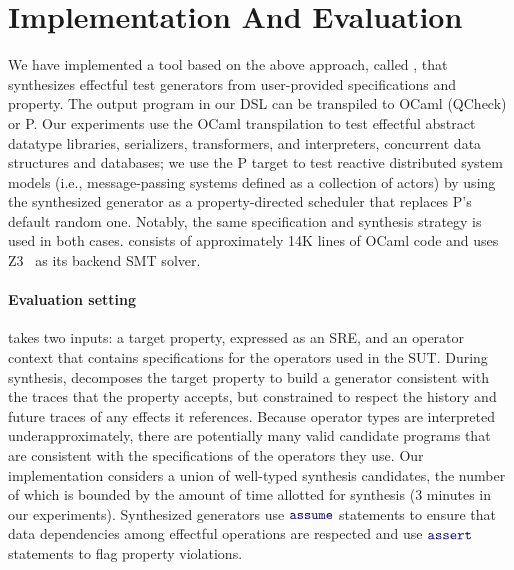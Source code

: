 \section{Implementation And Evaluation}\label{sec:impl}
%
We have implemented a tool based on the above approach, called
\name{}, that synthesizes effectful test generators from user-provided
\tyName{} specifications and property.  The output program in our DSL
can be transpiled to OCaml (QCheck) or P.  Our experiments use the
OCaml transpilation to test effectful abstract datatype libraries,
serializers, transformers, and interpreters, concurrent data
structures and databases; we use the P target to test reactive
distributed system models (i.e., message-passing systems defined as a
collection of actors) by using the synthesized generator as a
property-directed scheduler that replaces P's default random one.
Notably, the same specification and synthesis strategy is used in both
cases.  \name{} consists of approximately 14K lines of OCaml code and
uses Z3~\cite{de2008z3} as its backend SMT solver.

\paragraph{Evaluation setting} \name{} takes two inputs: a target
property, expressed as an SRE, and an operator context that contains
\tyName{} specifications for the operators used in the SUT.  During
synthesis, \name{} decomposes the target property to build a generator
consistent with the traces that the property accepts, but constrained
to respect the history and future traces of any effects it
references.  Because operator types are interpreted
underapproximately, there are potentially many valid candidate
programs that are consistent with the \tyName{} specifications of the
operators they use.  Our implementation considers a union of
well-typed synthesis candidates, the number of which is bounded by the
amount of time allotted for synthesis (3 minutes in our experiments).
Synthesized generators use $\mykw{assume}$ statements to ensure that
data dependencies among effectful operations are respected and use
$\mykw{assert}$ statements to flag property violations.

